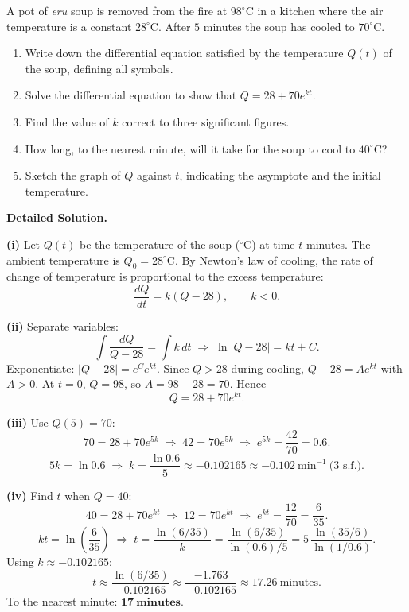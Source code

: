 \documentclass[11pt]{article}
\begin{document}
\begin{exoresolu}
A pot of \emph{eru} soup is removed from the fire at $98^\circ\mathrm{C}$ in a kitchen where the air temperature is a constant $28^\circ\mathrm{C}$. After $5$ minutes the soup has cooled to $70^\circ\mathrm{C}$.
\begin{enumerate}
\item Write down the differential equation satisfied by the temperature $Q(t)$ of the soup, defining all symbols.
\item Solve the differential equation to show that $Q = 28 + 70e^{kt}$.
\item Find the value of $k$ correct to three significant figures.
\item How long, to the nearest minute, will it take for the soup to cool to $40^\circ\mathrm{C}$?
\item Sketch the graph of $Q$ against $t$, indicating the asymptote and the initial temperature.
\end{enumerate}
\tcblower
\textbf{Detailed Solution.}

\textbf{(i)} Let $Q(t)$ be the temperature of the soup ($^\circ\mathrm{C}$) at time $t$ minutes. The ambient temperature is $Q_0 = 28^\circ\mathrm{C}$. By Newton's law of cooling, the rate of change of temperature is proportional to the excess temperature:
\[
\frac{dQ}{dt} = k(Q - 28), \qquad k<0.
\]

\textbf{(ii)} Separate variables:
\[
\int \frac{dQ}{Q-28} = \int k\,dt \;\Longrightarrow\; \ln|Q-28| = kt + C.
\]
Exponentiate: $|Q-28| = e^C e^{kt}$. Since $Q>28$ during cooling, $Q-28 = A e^{kt}$ with $A>0$.
At $t=0$, $Q=98$, so $A = 98-28 = 70$. Hence
\[
Q = 28 + 70 e^{kt}.
\]

\textbf{(iii)} Use $Q(5)=70$:
\[
70 = 28 + 70 e^{5k} \;\Longrightarrow\; 42 = 70 e^{5k} \;\Longrightarrow\; e^{5k} = \frac{42}{70} = 0.6.
\]
\[
5k = \ln 0.6 \;\Longrightarrow\; k = \frac{\ln 0.6}{5} \approx -0.102165 \approx \mathbf{-0.102}\ \mathrm{min}^{-1}\ \text{(3 s.f.)}.
\]

\textbf{(iv)} Find $t$ when $Q=40$:
\[
40 = 28 + 70 e^{kt} \;\Longrightarrow\; 12 = 70 e^{kt} \;\Longrightarrow\; e^{kt} = \frac{12}{70} = \frac{6}{35}.
\]
\[
kt = \ln\left(\frac{6}{35}\right) \;\Longrightarrow\; t = \frac{\ln(6/35)}{k} = \frac{\ln(6/35)}{\ln(0.6)/5} = 5\,\frac{\ln(35/6)}{\ln(1/0.6)}.
\]
Using $k\approx -0.102165$:
\[
t \approx \frac{\ln(6/35)}{-0.102165} \approx \frac{-1.763}{-0.102165} \approx 17.26\ \text{minutes}.
\]
To the nearest minute: $\mathbf{17\ \text{minutes}}$.


\end{exoresolu}
\end{document}
